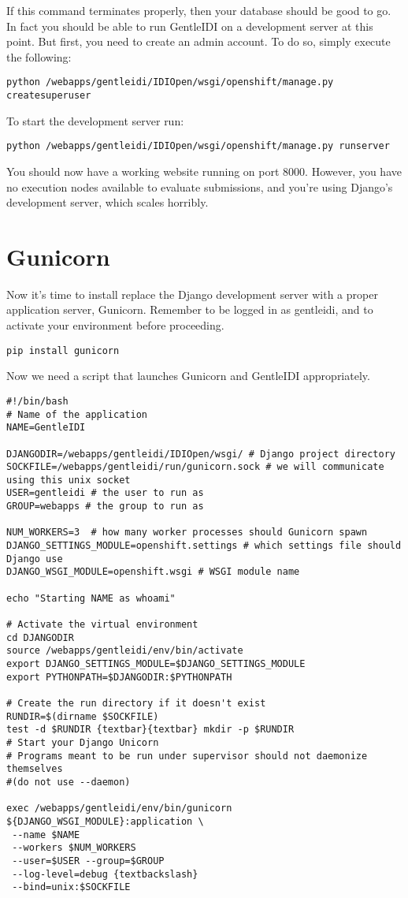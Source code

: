 If this command terminates properly, then your database should be good
to go. In fact you should be able to run GentleIDI on a development
server at this point. But first, you need to create an admin account. To
do so, simply execute the following:

\begin{verbatim}
python /webapps/gentleidi/IDIOpen/wsgi/openshift/manage.py createsuperuser
\end{verbatim}

To start the development server run:

\begin{verbatim}
python /webapps/gentleidi/IDIOpen/wsgi/openshift/manage.py runserver
\end{verbatim}

You should now have a working website running on port 8000. However, you
have no execution nodes available to evaluate submissions, and
you're using Django's development
server, which scales horribly.

\section{Gunicorn}
Now it's time to install replace the Django development
server with a proper application server, Gunicorn. Remember to be logged
in as gentleidi, and to activate your environment before proceeding.

\begin{verbatim}
pip install gunicorn
\end{verbatim}

Now we need a script that launches Gunicorn and GentleIDI appropriately.

\begin{verbatim}
#!/bin/bash
# Name of the application
NAME=GentleIDI

DJANGODIR=/webapps/gentleidi/IDIOpen/wsgi/ # Django project directory
SOCKFILE=/webapps/gentleidi/run/gunicorn.sock # we will communicate using this unix socket
USER=gentleidi # the user to run as
GROUP=webapps # the group to run as

NUM_WORKERS=3  # how many worker processes should Gunicorn spawn
DJANGO_SETTINGS_MODULE=openshift.settings # which settings file should Django use
DJANGO_WSGI_MODULE=openshift.wsgi # WSGI module name

echo "Starting NAME as whoami"

# Activate the virtual environment
cd DJANGODIR
source /webapps/gentleidi/env/bin/activate
export DJANGO_SETTINGS_MODULE=$DJANGO_SETTINGS_MODULE
export PYTHONPATH=$DJANGODIR:$PYTHONPATH

# Create the run directory if it doesn't exist
RUNDIR=$(dirname $SOCKFILE)
test -d $RUNDIR {textbar}{textbar} mkdir -p $RUNDIR
# Start your Django Unicorn
# Programs meant to be run under supervisor should not daemonize themselves 
#(do not use --daemon)

exec /webapps/gentleidi/env/bin/gunicorn ${DJANGO_WSGI_MODULE}:application \
 --name $NAME 
 --workers $NUM_WORKERS 
 --user=$USER --group=$GROUP 
 --log-level=debug {textbackslash}
 --bind=unix:$SOCKFILE
\end{verbatim}

